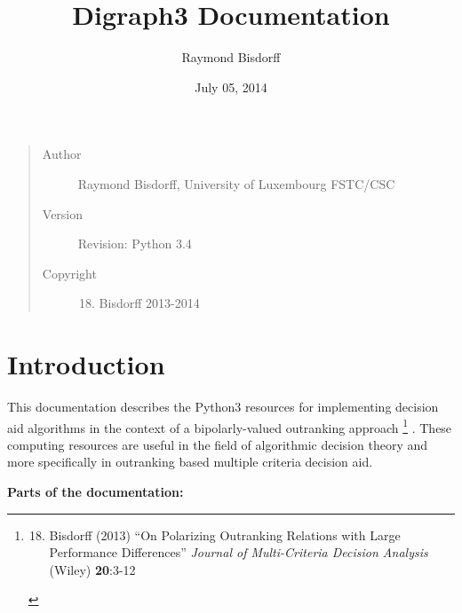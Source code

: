 \documentclass[letterpaper,10pt,english]{sphinxmanual}
\title{Digraph3 Documentation}
\date{July 05, 2014}
\author{Raymond Bisdorff}
\begin{document}
\maketitle
\tableofcontents
{}\label{index::doc}

\begin{quote}\begin{description}
\item[{Author}] \leavevmode
Raymond Bisdorff, University of Luxembourg FSTC/CSC

\item[{Version}] \leavevmode
Revision: Python 3.4

\item[{Copyright}] \leavevmode\begin{enumerate}
\setcounter{enumi}{17}
\item {} 
Bisdorff 2013-2014

\end{enumerate}

\end{description}\end{quote}


\chapter{Introduction}
\label{index:introduction-label}\label{index:introduction}\label{index:documentation-of-the-digraph3-resources}
This documentation describes the Python3 resources for implementing decision aid algorithms in the context of a bipolarly-valued outranking approach \footnote{\begin{enumerate}
\setcounter{enumi}{17}
\item {} 
Bisdorff (2013) ``On Polarizing Outranking Relations with Large Performance Differences'' \emph{Journal of Multi-Criteria Decision Analysis} (Wiley) \textbf{20}:3-12

\end{enumerate}
} . These computing resources are useful in the field of algorithmic decision theory and more specifically in outranking based multiple criteria decision aid.

\textbf{Parts of the documentation:}
\end{document}
